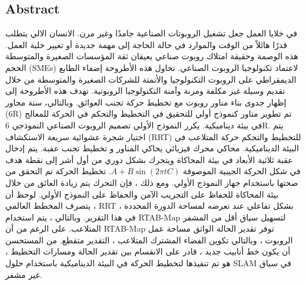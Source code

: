 


\noindent

\begin{otherlanguage}{arabic}

\chapter*{Abstract}

في خلايا العمل
جعل تشغيل الروبوتات الصناعية جامدًا وغير مرن. الانسان الالي
يتطلب قدرًا هائلاً من الوقت والموارد في حالة الحاجة إلى مهمة جديدة أو تغيير
خلية العمل.
هذه الوصمة وحقيقة امتلاك روبوت صناعي يعيقان ثقة المؤسسات الصغيرة والمتوسطة الحجم (SMEs)
لاعتماد تكنولوجيا الروبوت الصناعي. تحاول هذه الأطروحة إضفاء الطابع الديمقراطي على الروبوت
التكنولوجيا والأتمتة للشركات الصغيرة والمتوسطة من خلال تقديم وسيلة غير مكلفة ومرنة وآمنة
التكنولوجيا الروبوتية.
تهدف هذه الأطروحة إلى إظهار جدوى
بناء مناور روبوت مع تخطيط حركة تجنب العوائق.
وبالتالي،
ستة محاور (6R)
تم تطوير مناور كنموذج أولي للتحقيق في التخطيط والتحكم في الحركة للمعالج
  في بيئة ديناميكية.
  يكرر النموذج الأولي تصميم الروبوت الصناعي النموذجي 6R. يتم اختيار شجرة عشوائية سريعة الاستكشاف (RRT) للتخطيط والتحكم
حركة المتلاعب في البيئة الديناميكية.
محاكي محرك فيزيائي يحاكي المناور و
تخطيط تجنب عقبة.
يتم إدخال عقبة ثلاثية الأبعاد في بيئة المحاكاة
ويتحرك بشكل دوري من أول
أشر إلى نقطة هدف في شكل
الحركة الجيبية الموصوفة 
$A+B\sin{(2\pi tC)}$. 
تخطيط الحركة
تم التحقق من صحتها باستخدام جهاز النموذج الأولي. ومع ذلك ، فإن التحرك
  يتم زيادة العائق من خلال بيئة المحاكاة للحفاظ على التجريب الآمن
  والحفاظ على النموذج الأولي. لوحظ أن
  يتصرف المخطط العالمي ، RRT ، بشكل تفاعلي عند تعرضه لمساحة الدورة
  المحددة في هذا التقرير.
  وبالتالي ، يتم استخدام RTAB-Map لتسهيل سياق أقل من المشفر
المتلاعب.
على الرغم من أن RTAB-Map توفر تقدير الحالة الواثق
  مساحة عمل الروبوت ، وبالتالي تكوين الفضاء المشترك
  المتلاعب ، التقدير متقطع.
من المستحسن أن يكون خط أنابيب جديد ،
قادر على الانقسام بين تقدير الحالة ومسارات التخطيط ، هو
  تم تنفيذها لتخطيط الحركة في البيئة الديناميكية باستخدام حلول SLAM في سياق غير مشفر.
\end{otherlanguage}
\newpage

